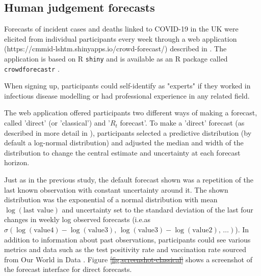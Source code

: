 \documentclass[10pt,a4paper,twocolumn]{article}
\providecommand{\DIFaddtex}[1]{{\protect\color{blue}\uwave{#1}}} %
\providecommand{\DIFdeltex}[1]{{\protect\color{red}\sout{#1}}}                      %
\providecommand{\DIFaddbegin}{} %
\providecommand{\DIFaddend}{} %
\providecommand{\DIFdelbegin}{} %
\providecommand{\DIFdelend}{} %
\providecommand{\DIFadd}[1]{\texorpdfstring{\DIFaddtex{#1}}{#1}} %
\providecommand{\DIFdel}[1]{\texorpdfstring{\DIFdeltex{#1}}{}} %
\begin{document}
\subsection*{Human judgement forecasts}

Forecasts of incident cases and deaths linked to COVID-19 in the UK were elicited from individual participants every week through a web application (https://cmmid-lshtm.shinyapps.io/crowd-forecast/) described in \cite{bosseComparingHumanModelbased2022}. The application is based on \textsf{R} \cite{R} \texttt{shiny} \cite{shiny} and is available as an \textsf{R} package called \texttt{crowdforecastr} \citep{crowdforecastr}. 

When signing up, participants could self-identify as "experts" if they worked in infectious disease modelling or had professional experience in any related field. 

The web application offered participants two different ways of making a forecast, called 'direct' (or 'classical') and '$R_t$ forecast'. To make a 'direct' forecast (as described in more detail in \cite{bosseComparingHumanModelbased2022}), participants selected a predictive distribution (by default a log-normal distribution) and adjusted the median and width of the distribution to change the central estimate and uncertainty at each forecast horizon. 

Just as in the previous study, the default forecast shown was a repetition of the last known observation with constant uncertainty around it. The shown distribution was the exponential of a normal distribution with mean $\log (\text{last value})$ and uncertainty set to the standard deviation of the last four changes in weekly log observed forecasts (i.e.\DIFaddbegin \DIFadd{, }\DIFaddend as $\sigma(\log(\text{value4}) - \log(\text{value3}), \, \log(\text{value3}) - \log(\text{value2}), \, \dots)$).
In addition to information about past observations, participants could see various metrics and data such as the test positivity rate and vaccination rate sourced from Our World in Data \citep{owidcoronavirus}. Figure \DIFdelbegin \DIFdel{\ref{fig:screenshot-classical} }\DIFdelend \DIFaddbegin \DIFadd{3 in the Supplementary Information \mbox{%
\cite{bosseSupplementaryInformationHuman2023} }\hskip0pt%
}\DIFaddend shows a screenshot of the forecast interface for direct forecasts. 
\end{document}

